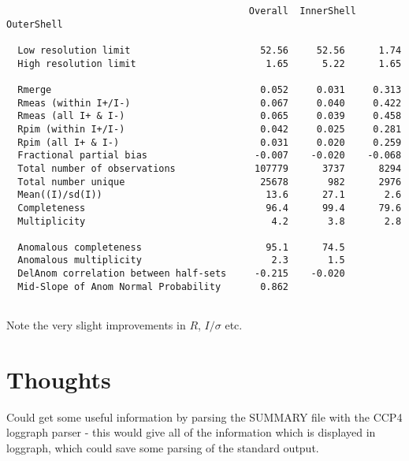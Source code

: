 \documentclass[a4paper, 11pt]{article}
\begin{document}
{\begin{verbatim}
                                           Overall  InnerShell OuterShell

  Low resolution limit                       52.56     52.56      1.74
  High resolution limit                       1.65      5.22      1.65

  Rmerge                                     0.052     0.031     0.313
  Rmeas (within I+/I-)                       0.067     0.040     0.422
  Rmeas (all I+ & I-)                        0.065     0.039     0.458
  Rpim (within I+/I-)                        0.042     0.025     0.281
  Rpim (all I+ & I-)                         0.031     0.020     0.259
  Fractional partial bias                   -0.007    -0.020    -0.068
  Total number of observations              107779      3737      8294
  Total number unique                        25678       982      2976
  Mean((I)/sd(I))                             13.6      27.1       2.6
  Completeness                                96.4      99.4      79.6
  Multiplicity                                 4.2       3.8       2.8

  Anomalous completeness                      95.1      74.5
  Anomalous multiplicity                       2.3       1.5
  DelAnom correlation between half-sets     -0.215    -0.020
  Mid-Slope of Anom Normal Probability       0.862


\end{verbatim}
}

Note the very slight improvements in $R$, $I/\sigma$ etc.

\section{Thoughts}

Could get some useful information by parsing the SUMMARY file with the 
CCP4 loggraph parser - this would give all of the information which 
is displayed in loggraph, which could save some parsing of the standard 
output.
\end{document}
